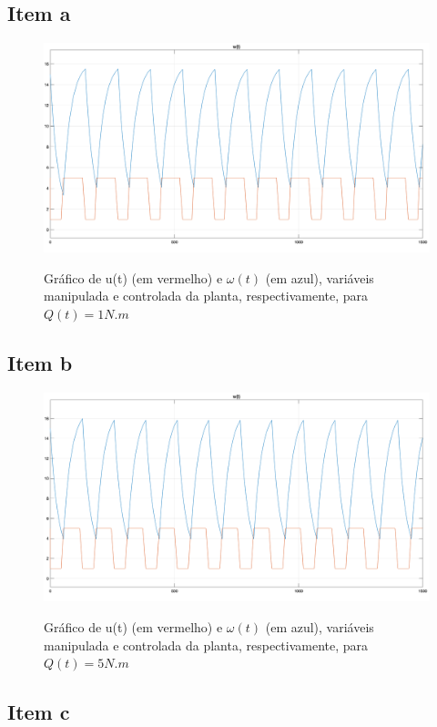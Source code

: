 \documentclass[11pt]{article}
\begin{document}
\subsection{Item a}
\begin{figure}[H]
	\centering
	{\includegraphics[width=\textwidth]
		{assets/q4_a_plot.png}}
	\caption{Gráfico de u(t) (em vermelho) e $\omega(t)$ (em azul), variáveis manipulada e controlada da planta, respectivamente, para $Q(t) = 1 N.m$}
\end{figure}

\subsection{Item b}
\begin{figure}[H]
	\centering
	{\includegraphics[width=\textwidth]
		{assets/q4_b_plot.png}}
	\caption{Gráfico de u(t) (em vermelho) e $\omega(t)$ (em azul), variáveis manipulada e controlada da planta, respectivamente, para $Q(t) = 5 N.m$}
\end{figure}

\subsection{Item c}
\end{document}
